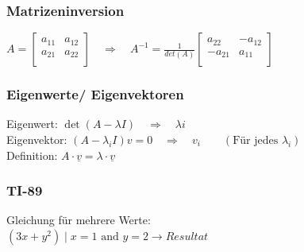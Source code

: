 	
	\begin{minipage}[t]{9.5cm}
		\subsubsection{Matrizeninversion}
			$A=\begin{bmatrix}
						a_{11}&a_{12}\\
						a_{21}&a_{22}\\
				\end{bmatrix}\quad\Rightarrow\quad
			A^{-1}=\frac{1}{det(A)}
			\begin{bmatrix}
				a_{22}&-a_{12}\\
				-a_{21}&a_{11}\\
			\end{bmatrix}$
	\end{minipage}
	\hfill
	\begin{minipage}[t]{9.5cm}
		\subsubsection{Eigenwerte/ Eigenvektoren}
			Eigenwert: $\det(A-\lambda I)\quad\Rightarrow\quad \lambda i$\\
			Eigenvektor: $(A-\lambda_i I)v=0\quad\Rightarrow\quad v_i\qquad(\text{Für jedes }\lambda_i)$\\
			Definition: $ A\cdot \underline{v} = \lambda \cdot \underline{v} $
	\end{minipage}
	
	
	\begin{minipage}[t]{9.5cm}
		\subsubsection{TI-89}
			Gleichung für mehrere Werte:\\
			$(3x+y^2) \mid x=1 \text{ and } y=2 \to Resultat$ 
	\end{minipage}
	
